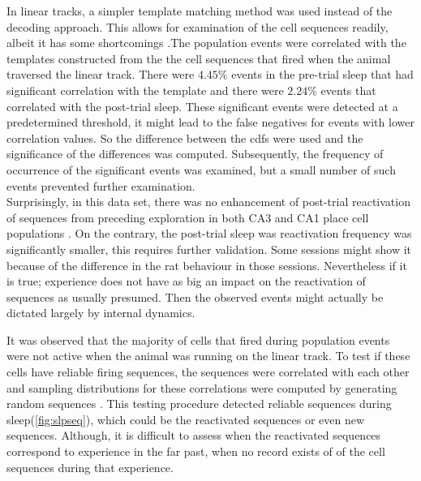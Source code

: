 In linear tracks, a simpler template matching method was used instead of the decoding approach. This allows for examination of the cell sequences readily, albeit it has some shortcomings \cite{Tatsuno2006}.The population events were correlated with the templates constructed from the the cell sequences that fired when the animal traversed the linear track. There were $4.45 \% $ events in the pre-trial sleep that had significant correlation with the template and there were $ 2.24 \% $  events that correlated with the post-trial sleep. These significant events were detected at a predetermined threshold, it might lead to the false negatives for events with lower correlation values. So the difference between the cdfs were used and the significance of the differences was computed. Subsequently, the frequency of occurrence of the significant events was examined, but a small number of such events prevented further examination.\\ 
Surprisingly, in this data set, there was no enhancement of post-trial reactivation of sequences from preceding exploration in both CA3 and CA1 place cell populations \cite{Lee2002}. On the contrary, the post-trial sleep was reactivation frequency was significantly smaller, this requires further validation. Some sessions might show it because of the difference in the rat behaviour in those sessions. Nevertheless if it is true; experience does not have as big an impact on the reactivation of sequences as usually presumed. Then the observed events might actually be dictated largely by internal dynamics. 

It was observed that the majority of cells that fired during population events were not active when the animal was running on the linear track. To test if these cells have reliable firing sequences, the sequences were correlated with each other and sampling distributions for these correlations were computed by generating random sequences \cite{Nadasdy1999}. This testing procedure detected reliable sequences during sleep(\autoref{fig:slpseq}), which    
could be the reactivated sequences or even new sequences. Although, it is difficult to assess when the reactivated sequences correspond to experience in the far past, when no record exists of of the cell sequences during that experience.

